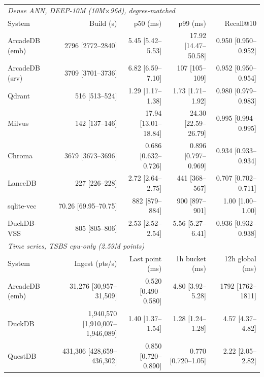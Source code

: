 \begin{tabular}{lrrrr}
\toprule
\multicolumn{5}{l}{\textit{Dense ANN, DEEP-10M (10M$\times$96d), degree-matched}} \\
System & Build (s) & p50 (ms) & p99 (ms) & Recall@10 \\
\midrule
ArcadeDB (emb) & 2796 [2772--2840] & 5.45 [5.42--5.53] & 17.92 [14.47--50.58] & 0.950 [0.950--0.952] \\
ArcadeDB (srv) & 3709 [3701--3736] & 6.82 [6.59--7.10] & 107 [105--109] & 0.952 [0.950--0.954] \\
Qdrant & 516 [513--524] & 1.29 [1.17--1.38] & 1.73 [1.71--1.92] & 0.980 [0.979--0.983] \\
Milvus & 142 [137--146] & 17.94 [13.01--18.84] & 24.30 [22.59--26.79] & 0.995 [0.994--0.995] \\
Chroma & 3679 [3673--3696] & 0.686 [0.632--0.726] & 0.896 [0.797--0.969] & 0.934 [0.933--0.934] \\
LanceDB & 227 [226--228] & 2.72 [2.64--2.75] & 441 [368--567] & 0.707 [0.702--0.711] \\
sqlite-vec & 70.26 [69.95--70.75] & 882 [879--884] & 900 [897--901] & 1.00 [1.00--1.00] \\
DuckDB-VSS & 805 [805--806] & 2.53 [2.52--2.54] & 5.56 [5.27--6.41] & 0.936 [0.932--0.938] \\
\midrule
\multicolumn{5}{l}{\textit{Time series, TSBS cpu-only (2.59M points)}} \\
System & Ingest (pts/s) & Last point (ms) & 1h bucket (ms) & 12h global (ms) \\
\midrule
ArcadeDB (emb) & 31,276 [30,957--31,509] & 0.520 [0.490--0.580] & 4.80 [3.92--5.28] & 1792 [1762--1811] \\
DuckDB & 1,940,570 [1,910,007--1,946,089] & 1.40 [1.37--1.54] & 1.28 [1.24--1.28] & 4.57 [4.37--4.82] \\
QuestDB & 431,306 [428,659--436,302] & 0.850 [0.720--0.890] & 0.770 [0.720--1.05] & 2.22 [2.05--2.82] \\
\bottomrule
\end{tabular}
